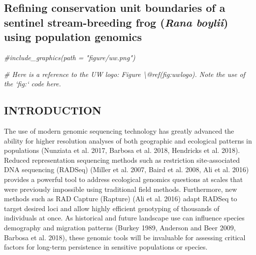 \documentclass[twoside,12pt,final]{ucthesis-CA2012} %
\newenvironment{Shaded}{}{}
\newcommand{\CommentTok}[1]{\textcolor[rgb]{0.38,0.63,0.69}{\textit{{#1}}}}
\begin{document}
\begin{ucmainmatter}
{\chapter{\texorpdfstring{Refining conservation unit boundaries of a
sentinel stream-breeding frog (\emph{Rana boylii}) using population
genomics}{Refining conservation unit boundaries of a sentinel stream-breeding frog (Rana boylii) using population genomics}}\label{rangewide}}
\begin{Shaded}
\begin{Highlighting}[]
\CommentTok{#include_graphics(path = "figure/uw.png")}

\CommentTok{# Here is a reference to the UW logo: Figure \textbackslash{}@ref(fig:uwlogo).  Note the use of the `fig:` code here.}
\end{Highlighting}
\end{Shaded}
\hypertarget{introduction-2}{%
\section{INTRODUCTION}\label{introduction-2}}

The use of modern genomic sequencing technology has greatly advanced the
ability for higher resolution analyses of both geographic and ecological
patterns in populations (Nunziata et al. 2017, Barbosa et al. 2018,
Hendricks et al. 2018). Reduced representation sequencing methods such
as restriction site-associated DNA sequencing (RADSeq) (Miller et al.
2007, Baird et al. 2008, Ali et al. 2016) provides a powerful tool to
address ecological genomics questions at scales that were previously
impossible using traditional field methods. Furthermore, new methods
such as RAD Capture (Rapture) (Ali et al. 2016) adapt RADSeq to target
desired loci and allow highly efficient genotyping of thousands of
individuals at once. As historical and future landscape use can
influence species demography and migration patterns (Burkey 1989,
Anderson and Beer 2009, Barbosa et al. 2018), these genomic tools will
be invaluable for assessing critical factors for long-term persistence
in sensitive populations or species.


\end{ucmainmatter}
\end{document}
